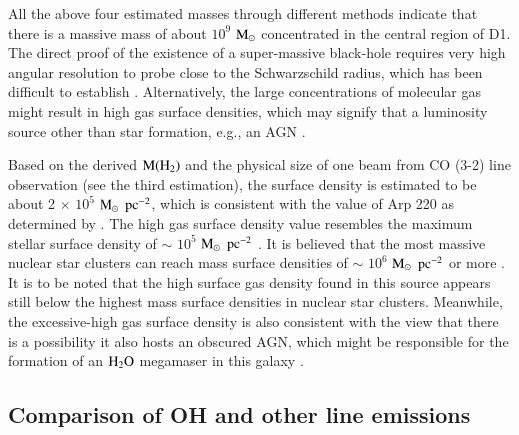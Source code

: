 \documentclass[]{aa} %
\begin{document}
All the above four estimated masses through different methods indicate that there is a massive mass of about $10^{9}$ $\rm M_{\odot}$ concentrated in the central region of D1. The direct proof of the existence of a super-massive black-hole requires very high angular resolution to probe close to the Schwarzschild radius, which has been difficult to establish \citep[see][]{2005ARA&A..43..625L}.  Alternatively, the large concentrations of molecular gas might result in high gas surface densities, which may signify that a luminosity source other than star formation, e.g., an AGN \citep{1999AJ....117.2632B}.

Based on the derived $\rm M(H_{2})$ and the physical size of one beam from CO (3-2) line observation (see the third estimation), the surface density is estimated to be about 2 $\times$ $10^{5}$ $\rm M_{\odot}$ $\rm pc^{-2}$, which is consistent with the value of Arp 220 as determined by \cite{2015ApJ...799...10B}. The high gas surface density value resembles the maximum stellar surface density of $\sim$ $10^{5}$ $\rm M_{\odot}$ $\rm pc^{-2}$ \citep{2010MNRAS.401L..19H}. It is believed that the most massive nuclear star clusters can reach mass surface densities of $\sim$ $10^{6}$ $\rm M_{\odot}$ $\rm pc^{-2}$ or more \citep[see][]{2020A&ARv..28....4N}. It is to be noted that the high surface gas density found in this source appears still below the highest mass surface densities in nuclear star clusters.  Meanwhile, the excessive-high gas surface density is also consistent with the view that there is a possibility it also hosts an obscured AGN, which might be responsible for the formation of an $\rm H_{2}O$ megamaser in this galaxy \citep[see][]{2016ApJ...816...55W,2011MNRAS.416.1267M}.


\subsection{Comparison of OH and other line emissions}
\end{document}
